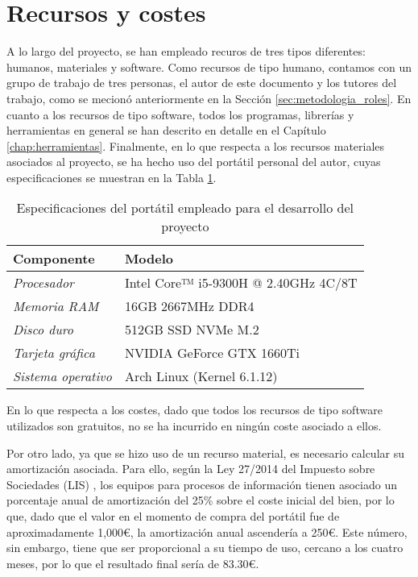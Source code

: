 \section{Recursos y costes}
\label{sec:planificacion_costes}

A lo largo del proyecto, se han empleado recuros de tres tipos diferentes: humanos, materiales y software.
Como recursos de tipo humano,
contamos con un grupo de trabajo de tres personas, el autor de este documento y los tutores del trabajo,
como se mecionó anteriormente en la Sección \ref{sec:metodologia_roles}.
En cuanto a los recursos de tipo software, todos los programas, librerías y herramientas en general
se han descrito en detalle en el Capítulo \ref{chap:herramientas}.
Finalmente, en lo que respecta a los recursos materiales asociados al proyecto, se ha hecho uso del portátil personal del autor,
cuyas especificaciones se muestran en la Tabla \ref{tab:costes_hardware}.

\bigskip
\begin{table}[H]
	\centering
	\begin{tabular}{|l|l|}
		\rowcolor{udcpink!25}
		\hline
		\small \textbf{Componente}        & \small \textbf{Modelo}                      \\ \hline
		\small \textit{Procesador}        & \small Intel Core™ i5-9300H @ 2.40GHz 4C/8T \\ \hline
		\small \textit{Memoria RAM}       & \small 16GB 2667MHz DDR4                    \\ \hline
		\small \textit{Disco duro}        & \small 512GB SSD NVMe M.2                   \\ \hline
		\small \textit{Tarjeta gráfica}   & \small NVIDIA GeForce GTX 1660Ti            \\ \hline
		\small \textit{Sistema operativo} & \small Arch Linux (Kernel 6.1.12)                    \\ \hline
	\end{tabular}
	\caption{Especificaciones del portátil empleado para el desarrollo del proyecto}
	\label{tab:costes_hardware}
\end{table}

\bigskip
En lo que respecta a los costes, dado que todos los recursos de tipo software utilizados son gratuitos, no se ha incurrido en ningún coste
asociado a ellos.

\bigskip
Por otro lado, ya que se hizo uso de un recurso material,
es necesario calcular su amortización asociada. Para ello, según la Ley 27/2014 del Impuesto sobre Sociedades (LIS) \cite{leysociedades},
los equipos para procesos de información tienen asociado un porcentaje anual de amortización del 25\% sobre el coste inicial del bien,
por lo que, dado que el valor en el momento de compra del portátil fue de aproximadamente 1,000€, la amortización anual ascendería a 250€. Este número, sin embargo,
tiene que ser proporcional a su tiempo de uso, cercano a los cuatro meses, por lo que el resultado final sería de 83.30€.

